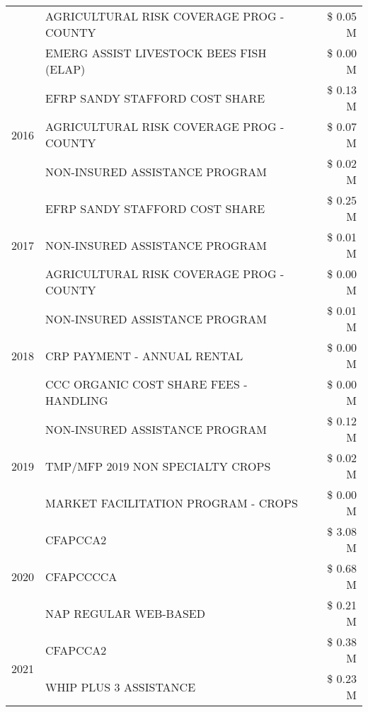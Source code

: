 \begin{tabular}{llr}
 & AGRICULTURAL RISK COVERAGE PROG - COUNTY & \$ 0.05 M \\
 & EMERG ASSIST LIVESTOCK BEES FISH (ELAP) & \$ 0.00 M \\
\cline{1-3}
\multirow[t]{3}{*}{2016} & EFRP SANDY STAFFORD COST SHARE & \$ 0.13 M \\
 & AGRICULTURAL RISK COVERAGE PROG - COUNTY & \$ 0.07 M \\
 & NON-INSURED ASSISTANCE PROGRAM & \$ 0.02 M \\
\cline{1-3}
\multirow[t]{3}{*}{2017} & EFRP SANDY STAFFORD COST SHARE & \$ 0.25 M \\
 & NON-INSURED ASSISTANCE PROGRAM & \$ 0.01 M \\
 & AGRICULTURAL RISK COVERAGE PROG - COUNTY & \$ 0.00 M \\
\cline{1-3}
\multirow[t]{3}{*}{2018} & NON-INSURED ASSISTANCE PROGRAM & \$ 0.01 M \\
 & CRP PAYMENT - ANNUAL RENTAL & \$ 0.00 M \\
 & CCC ORGANIC COST SHARE FEES - HANDLING & \$ 0.00 M \\
\cline{1-3}
\multirow[t]{3}{*}{2019} & NON-INSURED ASSISTANCE PROGRAM & \$ 0.12 M \\
 & TMP/MFP 2019 NON SPECIALTY CROPS & \$ 0.02 M \\
 & MARKET FACILITATION PROGRAM - CROPS & \$ 0.00 M \\
\cline{1-3}
\multirow[t]{3}{*}{2020} & CFAPCCA2 & \$ 3.08 M \\
 & CFAPCCCCA & \$ 0.68 M \\
 & NAP REGULAR WEB-BASED & \$ 0.21 M \\
\cline{1-3}
\multirow[t]{2}{*}{2021} & CFAPCCA2 & \$ 0.38 M \\
 & WHIP PLUS 3 ASSISTANCE & \$ 0.23 M \\
\cline{1-3}
\bottomrule
\end{tabular}
